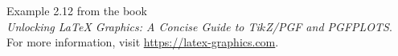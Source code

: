 \documentclass{article}
\begin{document}
Example 2.12 from the book\\
\emph{Unlocking LaTeX Graphics: A Concise Guide to Ti$k$Z/PGF and PGFPLOTS}.\\
For more information, visit \url{https://latex-graphics.com}.
\par\bigskip

\end{document}

